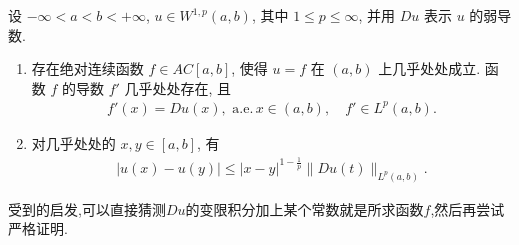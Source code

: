 \documentclass[../../main.tex]{subfiles}
\begin{document}
\begin{proposition}\label{proposition:W1p空间函数基本性质}
设 $-\infty<a<b<+\infty$, $u\in W^{1,p}(a,b)$, 其中 $1\leqslant p\leqslant\infty$, 并用 $Du$ 表示 $u$ 的弱导数.
\begin{enumerate}[(1)]
\item\label{proposition:W1p空间函数基本性质-1}
存在绝对连续函数 $f\in AC[a,b]$, 使得 $u=f$ 在 $(a,b)$ 上几乎处处成立. 函数 $f$ 的导数 $f'$ 几乎处处存在, 且
\begin{align*}
f'(x)=Du(x),\,\,\text{a.e.}\,x\in (a,b),\quad
f'\in L^p(a,b).
\end{align*}

\item\label{proposition:W1p空间函数基本性质-2}
对几乎处处的 $x,y\in[a,b]$, 有
\begin{align*}
|u(x)-u(y)|
\leqslant
|x-y|^{1-\frac{1}{p}}\|Du(t)\|_{L^p(a,b)}.
\end{align*}
\end{enumerate}
\end{proposition}
\begin{note}
受到的启发,可以直接猜测$Du$的变限积分加上某个常数就是所求函数$f$,然后再尝试严格证明.
\end{note}
\end{document}
